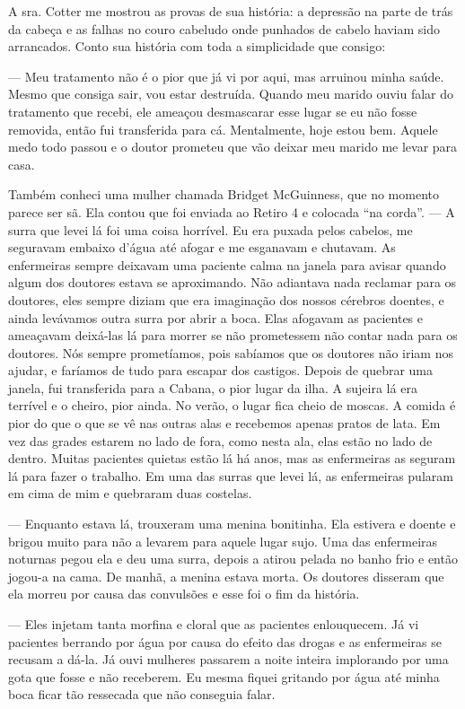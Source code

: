 A sra. Cotter me mostrou as provas de sua história: a depressão na parte
de trás da cabeça e as falhas no couro cabeludo onde punhados de cabelo
haviam sido arrancados. Conto sua história com toda a simplicidade que
consigo: 

--- Meu tratamento não é o pior que já vi por aqui, mas
arruinou minha saúde. Mesmo que consiga sair, vou estar destruída.
Quando meu marido ouviu falar do tratamento que recebi, ele ameaçou
desmascarar esse lugar se eu não fosse removida, então fui transferida
para cá. Mentalmente, hoje estou bem. Aquele medo todo passou e o doutor
prometeu que vão deixar meu marido me levar para casa.

Também conheci uma mulher chamada Bridget McGuinness, que no momento
parece ser sã. Ela contou que foi enviada ao Retiro 4 e colocada ``na
corda''. --- A surra que levei lá foi uma coisa horrível. Eu era puxada
pelos cabelos, me seguravam embaixo d'água até afogar e me esganavam e
chutavam. As enfermeiras sempre deixavam uma paciente calma na janela
para avisar quando algum dos doutores estava se aproximando. Não
adiantava nada reclamar para os doutores, eles sempre diziam que era
imaginação dos nossos cérebros doentes, e ainda levávamos outra surra
por abrir a boca. Elas afogavam as pacientes e ameaçavam deixá-las lá
para morrer se não prometessem não contar nada para os doutores. Nós
sempre prometíamos, pois sabíamos que os doutores não iriam nos ajudar,
e faríamos de tudo para escapar dos castigos. Depois de quebrar uma
janela, fui transferida para a Cabana, o pior lugar da ilha. A sujeira
lá era terrível e o cheiro, pior ainda. No verão, o lugar fica cheio de
moscas. A comida é pior do que o que se vê nas outras alas e recebemos
apenas pratos de lata. Em vez das grades estarem no lado de fora, como
nesta ala, elas estão no lado de dentro. Muitas pacientes quietas estão
lá há anos, mas as enfermeiras as seguram lá para fazer o trabalho. Em
uma das surras que levei lá, as enfermeiras pularam em cima de mim e
quebraram duas costelas.

--- Enquanto estava lá, trouxeram uma menina bonitinha. Ela estivera e
doente e brigou muito para não a levarem para aquele lugar sujo. Uma das
enfermeiras noturnas pegou ela e deu uma surra, depois a atirou pelada
no banho frio e então jogou-a na cama. De manhã, a menina estava morta.
Os doutores disseram que ela morreu por causa das convulsões e esse foi
o fim da história.

--- Eles injetam tanta morfina e cloral que as pacientes enlouquecem. Já
vi pacientes berrando por água por causa do efeito das drogas e as
enfermeiras se recusam a dá-la. Já ouvi mulheres passarem a noite
inteira implorando por uma gota que fosse e não receberem. Eu mesma
fiquei gritando por água até minha boca ficar tão ressecada que não
conseguia falar.

